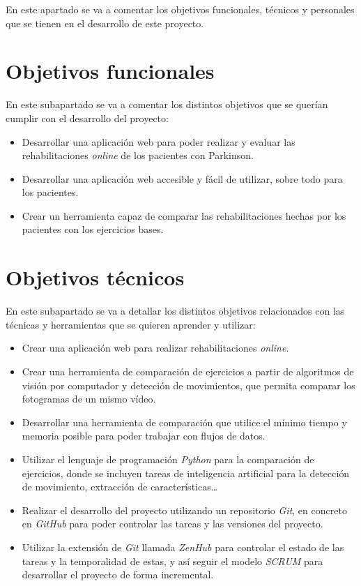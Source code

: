 
En este apartado se va a comentar los objetivos funcionales, técnicos y personales que se tienen en el desarrollo de este proyecto.

\section{Objetivos funcionales}
En este subapartado se va a comentar los distintos objetivos que se querían cumplir con el desarrollo del proyecto:
\begin{itemize}
	\item Desarrollar una aplicación web para poder realizar y evaluar las rehabilitaciones \textit{online} de los pacientes con Parkinson.
	\item Desarrollar una aplicación web accesible y fácil de utilizar, sobre todo para los pacientes.
	\item Crear un herramienta capaz de comparar las rehabilitaciones hechas por los pacientes con los ejercicios bases.
\end{itemize}

\section{Objetivos técnicos}
En este subapartado se va a detallar los distintos objetivos relacionados con las técnicas y herramientas que se quieren aprender y utilizar:
\begin{itemize}
	\item Crear una aplicación web para realizar rehabilitaciones \textit{online}.
	\item Crear una herramienta de comparación de ejercicios a partir de algoritmos de visión por computador y detección de movimientos, que permita comparar los fotogramas de un mismo vídeo.
	\item Desarrollar una herramienta de comparación que utilice el mínimo tiempo y memoria posible para poder trabajar con flujos de datos.
	\item Utilizar el lenguaje de programación \textit{Python} para la comparación de ejercicios, donde se incluyen tareas de inteligencia artificial para la detección de movimiento, extracción de características\ldots
	\item Realizar el desarrollo del proyecto utilizando un repositorio \textit{Git}, en concreto en \textit{GitHub} para poder controlar las tareas y las versiones del proyecto.
	\item Utilizar la extensión de \textit{Git} llamada \textit{ZenHub} para controlar el estado de las tareas y la temporalidad de estas, y así seguir el modelo \textit{SCRUM} para desarrollar el proyecto de forma incremental.
\end{itemize}

